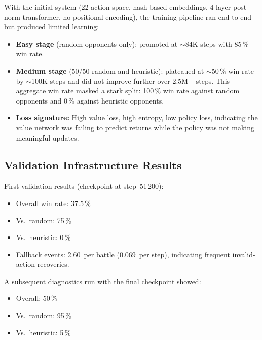 With the initial system (22-action space, hash-based embeddings, 4-layer
post-norm transformer, no positional encoding), the training pipeline ran
end-to-end but produced limited learning:

\begin{itemize}
  \item \textbf{Easy stage} (random opponents only): promoted at
        ${\sim}$84K steps with 85\,\% win rate.
  \item \textbf{Medium stage} (50/50 random and heuristic): plateaued at
        ${\sim}$50\,\% win rate by ${\sim}$100K steps and did not improve
        further over 2.5M+ steps.  This aggregate win rate masked a stark
        split: 100\,\% win rate against random opponents and 0\,\% against
        heuristic opponents.
  \item \textbf{Loss signature:} High value loss, high entropy, low policy
        loss, indicating the value network was failing to predict returns
        while the policy was not making meaningful updates.
\end{itemize}


\subsection{Validation Infrastructure Results}

First validation results (checkpoint at step~51\,200):
\begin{itemize}
  \item Overall win rate: 37.5\,\%
  \item Vs.\ random: 75\,\%
  \item Vs.\ heuristic: 0\,\%
  \item Fallback events: 2.60~per battle (0.069~per step), indicating frequent
        invalid-action recoveries.
\end{itemize}

A subsequent diagnostics run with the final checkpoint showed:
\begin{itemize}
  \item Overall: 50\,\%
  \item Vs.\ random: 95\,\%
  \item Vs.\ heuristic: 5\,\%
\end{itemize}

